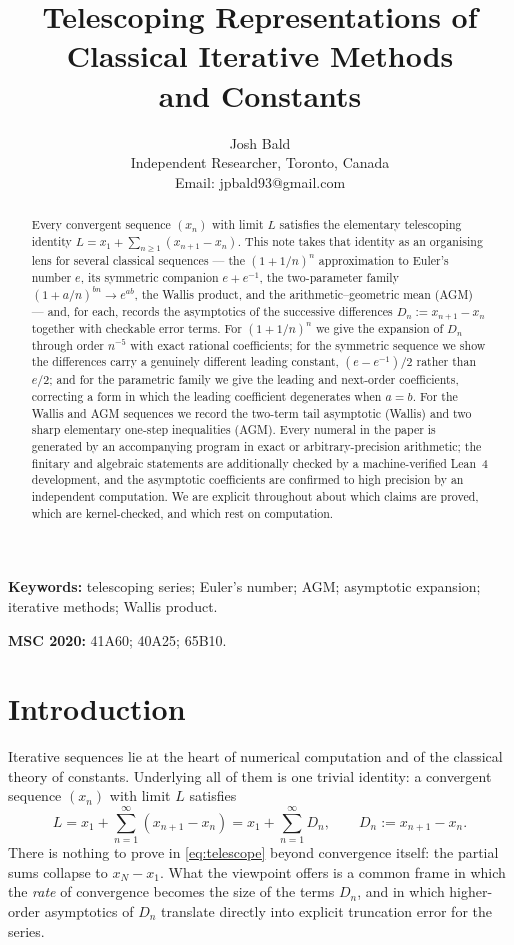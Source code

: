 \documentclass[11pt]{article}
\title{Telescoping Representations of Classical Iterative Methods\\
       and Constants}
\author{Josh Bald\\ \small Independent Researcher, Toronto, Canada\\
        \small Email: jpbald93@gmail.com}
\date{}
\theoremstyle{plain}
\theoremstyle{remark}
\begin{document}
\maketitle

\begin{abstract}
Every convergent sequence $(x_n)$ with limit $L$ satisfies the elementary
telescoping identity $L = x_1 + \sum_{n\ge1}(x_{n+1}-x_n)$. This note takes that
identity as an organising lens for several classical sequences --- the
$(1+1/n)^n$ approximation to Euler's number $e$, its symmetric companion
$e+e^{-1}$, the two-parameter family $(1+a/n)^{bn}\to e^{ab}$, the
Wallis product, and the arithmetic--geometric mean (AGM) --- and, for
each, records
the asymptotics of the successive differences $D_n := x_{n+1}-x_n$ together with
checkable error terms. For $(1+1/n)^n$ we give the expansion of
$D_n$ through order $n^{-5}$ with exact rational coefficients; for the symmetric
sequence we show the differences carry a genuinely different leading constant,
$(e-e^{-1})/2$ rather than $e/2$; and for the parametric family we give the
leading and next-order coefficients, correcting a form in which the leading
coefficient degenerates when $a=b$. For the Wallis and AGM sequences we record
the two-term tail asymptotic (Wallis) and two sharp elementary one-step
inequalities (AGM). Every numeral in the paper is generated by an
accompanying program in exact or arbitrary-precision arithmetic; the finitary
and algebraic statements are additionally checked by a machine-verified Lean~4
development, and the asymptotic coefficients are confirmed to high precision by
an independent computation. We are explicit throughout about which claims are
proved, which are kernel-checked, and which rest on computation.
\end{abstract}

\noindent\textbf{Keywords:} telescoping series; Euler's number; AGM;
asymptotic expansion; iterative methods; Wallis product.

\noindent\textbf{MSC 2020:} 41A60; 40A25; 65B10.

\section{Introduction}
\label{sec:intro}

Iterative sequences lie at the heart of numerical computation and of the
classical theory of constants. Underlying all of them is one trivial identity:
a convergent sequence $(x_n)$ with limit $L$ satisfies
\begin{equation}
  L = x_1 + \sum_{n=1}^{\infty}(x_{n+1}-x_n) = x_1 + \sum_{n=1}^{\infty} D_n,
  \qquad D_n := x_{n+1} - x_n .
  \label{eq:telescope}
\end{equation}
There is nothing to prove in \eqref{eq:telescope} beyond convergence itself: the
partial sums collapse to $x_{N}-x_1$. What the viewpoint offers is a common
frame in which the \emph{rate} of convergence becomes the size of the terms
$D_n$, and in which higher-order asymptotics of $D_n$ translate directly into
explicit truncation error for the series.
\end{document}
